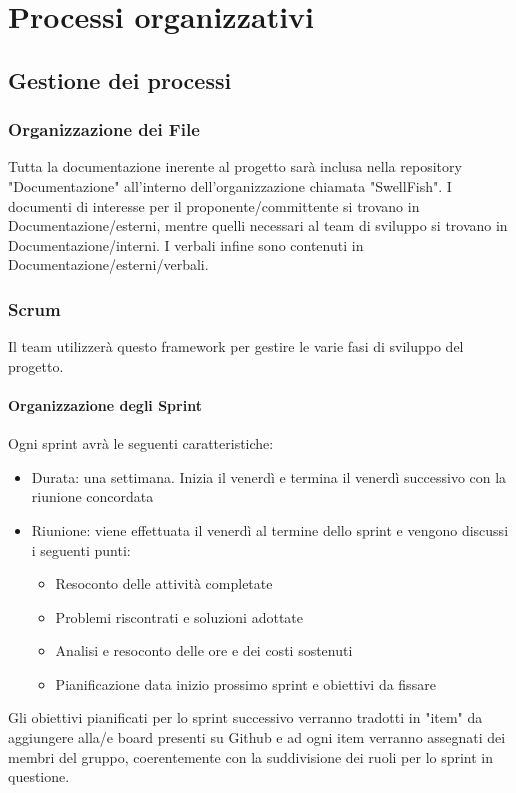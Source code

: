 \documentclass[12pt]{article}
\begin{document}
\section{Processi organizzativi}
\subsection{Gestione dei processi}
\subsubsection{Organizzazione dei File}
Tutta la documentazione inerente al progetto sarà inclusa nella repository "Documentazione" all'interno dell'organizzazione chiamata "SwellFish".
I documenti di interesse per il proponente/committente si trovano in Documentazione/esterni, mentre quelli necessari al team di sviluppo si trovano in Documentazione/interni.
I verbali infine sono contenuti in Documentazione/esterni/verbali.

\subsubsection{Scrum}
Il team utilizzerà questo framework per gestire le varie fasi di sviluppo del progetto.
\paragraph{Organizzazione degli Sprint}
Ogni sprint avrà le seguenti caratteristiche:
\begin{itemize}
    \item Durata: una settimana. Inizia il venerdì e termina il venerdì successivo con la riunione concordata
    \item Riunione: viene effettuata il venerdì al termine dello sprint e vengono discussi i seguenti punti:
          \begin{itemize}
              \item Resoconto delle attività completate
              \item Problemi riscontrati e soluzioni adottate
              \item Analisi e resoconto delle ore e dei costi sostenuti
              \item Pianificazione data inizio prossimo sprint e obiettivi da fissare
          \end{itemize}
\end{itemize}
Gli obiettivi pianificati per lo sprint successivo verranno tradotti in "item" da aggiungere alla/e board presenti su Github e ad ogni item verranno assegnati dei membri del gruppo, coerentemente con la suddivisione dei ruoli per lo sprint in questione.
\end{document}
